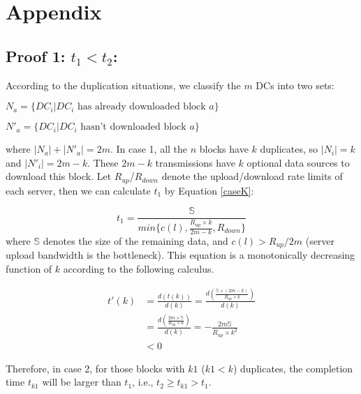 \section{Appendix}
\subsection{Proof 1: $t_1 < t_2$:}\label{appendix:balance}

According to the duplication situations, we classify the $m$ DCs into two sets:

$N_a = \{DC_i|DC_i \text{ has already downloaded block $a$}\}$

$N'_a = \{DC_i|DC_i \text{ hasn't downloaded block $a$}\}$

where $|N_a| + |N'_a| = 2m$. In case 1, all the $n$ blocks have $k$ duplicates, so $|N_i| = k$ and $|N'_i| = 2m-k$. These $2m-k$ transmissions have $k$ optional data sources to download this block. Let $R_{up}$/$R_{down}$ denote the upload/download rate limits of each server, then we can calculate $t_1$ by Equation \ref{caseK}:

\begin{equation}
\label{caseK}
t_1 = \frac{\mathbb{S}}{min\{c(l),\frac{R_{up}\times k}{2m-k},R_{down}\}}
\end{equation}
where $\mathbb{S}$ denotes the size of the remaining data, and $c(l) > R_{up}/2m$ (server upload bandwidth is the bottleneck). This equation is a monotonically decreasing function of $k$ according to the following calculus.

\begin{equation}
\label{calculus}
\begin{split}
t'(k) &= \frac{d(t(k))}{d(k)} = \frac{d(\frac{\mathbb{S}\times (2m-k)}{R_{up}\times k})}{d(k)} \\
    &= \frac{d(\frac{2m\times \mathbb{S}}{R_{up}\times k})}{d(k)} = -\frac{2m\mathbb{S}}{R_{up}\times k^2} \\
    &< 0
\end{split}
\end{equation}

Therefore, in case 2, for those blocks with $k1$ ($k1<k$) duplicates, the completion time $t_{k1}$ will be larger than $t_1$, i.e., $t_2 \geq t_{k1} > t_1$.


